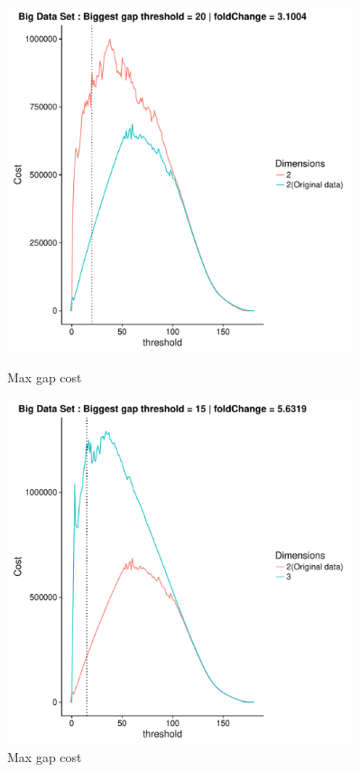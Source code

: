 \documentclass[a4paper,10pt]{article}
\theoremstyle{plain}
\theoremstyle{definition}
\begin{document}
\begin{figure}[H]
	\centering
	\begin{minipage}{0.75\textwidth}
		\centering
		\includegraphics[width=0.9\textwidth]{./plots/plotsCostAndSimAp234/plotBigDataCostAndSim-AP4-S21-K2.pdf}
		\caption{Max gap cost}
		\label{fig:maxGapCostBigDataAp4K2}
	\end{minipage}
	\begin{minipage}{0.75\textwidth}
		\centering
		\includegraphics[width=0.9\textwidth]{./plots/plotsCostAndSimAp234/plotBigDataCostAndSim-AP4-S7-K3.pdf}
		\caption{Max gap cost}
		\label{fig:maxGapCostBigDataAp4K3}
	\end{minipage}
\end{figure}
\end{document}
